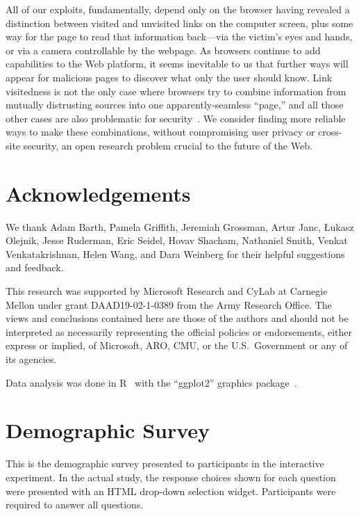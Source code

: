 \documentclass[conference]{IEEEtran}
\begin{document}
All of our exploits, fundamentally, depend only on the browser having
revealed a distinction between visited and unvisited links on the
computer screen, plus some way for the page to read that information
back---via the victim's eyes and hands, or via a camera controllable
by the webpage.  As browsers continue to add capabilities to the Web
platform, it seems inevitable to us that further ways will appear for
malicious pages to discover what only the user should know.  Link
visitedness is not the only case where browsers try to combine
information from mutually distrusting sources into one
apparently-seamless “page,” and all those other cases are also
problematic for security~\cite{roc:distinguish,annevk:consistency}.
We consider finding more reliable ways to make these combinations,
without compromising user privacy or cross-site security, an open
research problem crucial to the future of the Web.

\section*{Acknowledgements}

We thank
Adam Barth,
Pamela Griffith,
Jeremiah Grossman,
Artur Janc,
Łukasz Olejnik,
Jesse Ruderman,
Eric Seidel,
Hovav Shacham,
Nathaniel Smith,
Venkat Venkatakrishnan,
Helen Wang,
and
Dara Weinberg
for their helpful suggestions and feedback.

This research was supported by Microsoft Research and
CyLab at Carnegie Mellon under
grant DAAD19-02-1-0389 from the Army Research Office. The views and
conclusions contained here are those of the authors and should not be
interpreted as necessarily representing the official policies or
endorsements, either express or implied, of Microsoft, ARO, CMU, or the
U.S.~Government or any of its agencies.

Data analysis was done in R~\cite{rlang} with the “ggplot2” graphics
package~\cite{rggplot2}.




\appendices
\section{Demographic Survey}\label{sec:survey}

This is the demographic survey presented to participants in the
interactive experiment.  In the actual study, the response choices
shown for each question were presented with an HTML drop-down
selection widget.  Participants were required to answer all questions.
\end{document}

